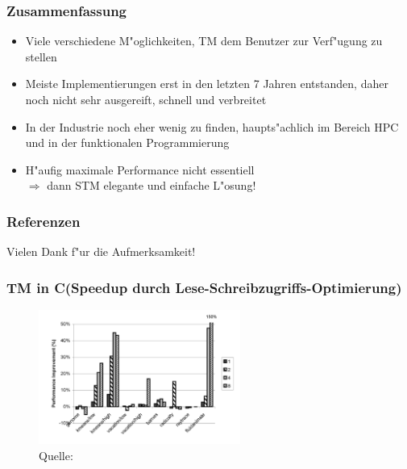 \documentclass[t]{beamer}
\newcommand{\Rplus}{\protect\raisebox{.1ex}{+}}
\newcommand{\Cpp}{\mbox{C\Rplus\Rplus}\xspace}
\begin{document}
\begin{frame}[fragile]
  \frametitle{Zusammenfassung}

  \begin{itemize}
    \item Viele verschiedene M"oglichkeiten, TM dem Benutzer zur Verf"ugung zu stellen
    \item Meiste Implementierungen erst in den letzten 7 Jahren entstanden,
          daher noch nicht sehr ausgereift, schnell und verbreitet
    \item In der Industrie noch eher wenig zu finden, haupts"achlich im Bereich
          HPC und in der funktionalen Programmierung
    \item H"aufig maximale Performance nicht essentiell \\
          $\Rightarrow$ dann STM elegante und einfache L"osung!
  \end{itemize}
\end{frame}

\begin{frame}
  \scriptsize
  \frametitle{Referenzen}
  
\end{frame}

\begin{frame}
  Vielen Dank f"ur die Aufmerksamkeit!
\end{frame}

\begin{frame}
  \frametitle{TM in \Cpp (Speedup durch Lese-Schreibzugriffs-Optimierung)}
  \begin{figure}[!t]
      \includegraphics[width=250px]{compiler_optimizations.png}
      \caption{Quelle: \protect\cite[Abbildung 13]{IntegrTMC++}}
      \label{fig:compiler_optimizations}
  \end{figure}
\end{frame}
\end{document}
